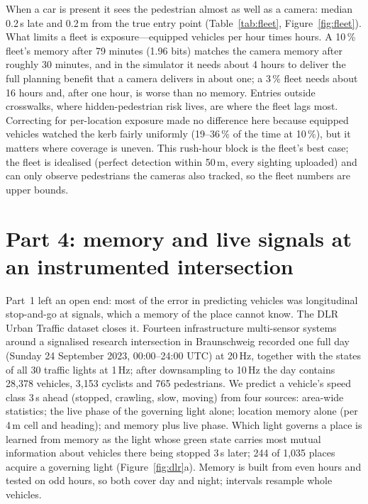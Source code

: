 \documentclass[11pt,a4paper]{article}
\newcommand{\pct}{\,\%}
\begin{document}
When a car is present it sees the pedestrian almost as well as a camera: median 0.2\,s late and 0.2\,m from the true entry point (Table~\ref{tab:fleet}, Figure~\ref{fig:fleet}).
What limits a fleet is exposure---equipped vehicles per hour times hours.
A 10\pct{} fleet's memory after 79 minutes (1.96 bits) matches the camera memory after roughly 30 minutes, and in the simulator it needs about 4 hours to deliver the full planning benefit that a camera delivers in about one; a 3\pct{} fleet needs about 16 hours and, after one hour, is worse than no memory.
Entries outside crosswalks, where hidden-pedestrian risk lives, are where the fleet lags most.
Correcting for per-location exposure made no difference here because equipped vehicles watched the kerb fairly uniformly (19--36\pct{} of the time at 10\pct), but it matters where coverage is uneven.
This rush-hour block is the fleet's best case; the fleet is idealised (perfect detection within 50\,m, every sighting uploaded) and can only observe pedestrians the cameras also tracked, so the fleet numbers are upper bounds.

\section{Part 4: memory and live signals at an instrumented intersection}
\label{sec:dlr}

Part~1 left an open end: most of the error in predicting vehicles was longitudinal stop-and-go at signals, which a memory of the place cannot know.
The DLR Urban Traffic dataset \citep{dlr_ut} closes it. Fourteen infrastructure multi-sensor systems around a signalised research intersection in Braunschweig recorded one full day (Sunday 24 September 2023, 00:00--24:00 UTC) at 20\,Hz, together with the states of all 30 traffic lights at 1\,Hz; after downsampling to 10\,Hz the day contains 28{,}378 vehicles, 3{,}153 cyclists and 765 pedestrians.
We predict a vehicle's speed class 3\,s ahead (stopped, crawling, slow, moving) from four sources: area-wide statistics; the live phase of the governing light alone; location memory alone (per 4\,m cell and heading); and memory plus live phase. Which light governs a place is learned from memory as the light whose green state carries most mutual information about vehicles there being stopped 3\,s later; 244 of 1{,}035 places acquire a governing light (Figure~\ref{fig:dlr}a). Memory is built from even hours and tested on odd hours, so both cover day and night; intervals resample whole vehicles.
\end{document}
